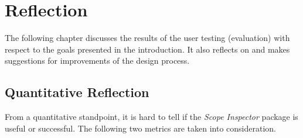 \chapter{Reflection}\label{reflection}

The following chapter discusses the results of the user testing
(evaluation) with respect to the goals presented in the introduction. It
also reflects on and makes suggestions for improvements of the design
process.

\section{Quantitative Reflection}\label{quantitative-reflection}

From a quantitative standpoint, it is hard to tell if the \emph{Scope
Inspector} package is useful or successful. The following two metrics
are taken into consideration.

